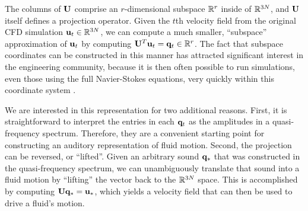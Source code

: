 \documentclass[11pt]{article}
\begin{document}
The columns of $\mathbf{U}$ comprise an $r$-dimensional subspace $\mathbb{R}^r$ inside of $\mathbb{R}^{3N}$, and $\mathbf{U}$ itself defines a projection operator. Given the $t$th velocity field from the original CFD simulation $\mathbf{u}_t \in \mathbb{R}^{3N}$, we can compute a much smaller, ``subspace'' approximation of $\mathbf{u}_t$ by computing $\mathbf{U}^T \mathbf{u}_t = \mathbf{q}_t \in \mathbb{R}^r$. The fact that subspace coordinates can be constructed in this manner has attracted significant interest in the engineering community, because it is then often possible to run simulations, even those using the full Navier-Stokes equations, very quickly within this coordinate system \cite{Kim2013}.

We are interested in this representation for two additional reasons. First, it is straightforward to interpret the entries in each $\mathbf{q}_t$ as the amplitudes in a quasi-frequency spectrum. Therefore, they are a convenient starting point for constructing an auditory representation of fluid motion. Second, the projection can be reversed, or ``lifted''. Given an arbitrary sound $\mathbf{q}_*$ that was constructed in the quasi-frequency spectrum, we can unambiguously translate that sound into a fluid motion by ``lifting'' the vector back to the $\mathbb{R}^{3N}$ space. This is accomplished by computing $\mathbf{U} \mathbf{q}_* = \mathbf{u}_*$, which yields a velocity field that can then be used to drive a fluid's motion.
\end{document}
